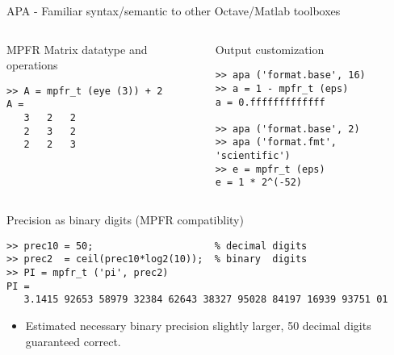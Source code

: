 \begin{frame}[fragile]{APA - Familiar syntax/semantic to other Octave/Matlab toolboxes}

\begin{columns}
\begin{column}{0.45\linewidth}
\begin{block}{MPFR Matrix datatype and operations}
\begin{lstlisting}[basicstyle=\scriptsize,
xleftmargin=0.2cm,]
>> A = mpfr_t (eye (3)) + 2
A =
   3   2   2
   2   3   2
   2   2   3
\end{lstlisting}
\end{block}
\end{column}
\begin{column}{0.4\linewidth}
\begin{block}{Output customization}
\begin{lstlisting}[basicstyle=\tiny,
xleftmargin=0.2cm,]
>> apa ('format.base', 16)
>> a = 1 - mpfr_t (eps)
a = 0.fffffffffffff

>> apa ('format.base', 2)
>> apa ('format.fmt', 'scientific')
>> e = mpfr_t (eps)
e = 1 * 2^(-52)
\end{lstlisting}
\end{block}
\end{column}
\end{columns}

\begin{block}{Precision as binary digits (MPFR compatiblity)}
\begin{lstlisting}[basicstyle=\scriptsize,
xleftmargin=0.8cm,]
>> prec10 = 50;                     % decimal digits
>> prec2  = ceil(prec10*log2(10));  % binary  digits
>> PI = mpfr_t ('pi', prec2)
PI =
   3.1415 92653 58979 32384 62643 38327 95028 84197 16939 93751 01
\end{lstlisting}
\begin{itemize}
\item
Estimated necessary binary precision slightly larger,
50 decimal digits guaranteed correct.
\end{itemize}
\end{block}

\end{frame}


